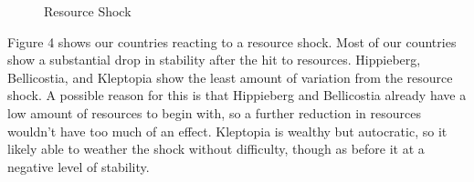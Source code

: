\documentclass[12pt]{article}
\begin{document}
\begin{spacing}{1.5}
\begin{figure}[htb]
\centering 
\caption{Resource Shock}
\end{figure}

Figure 4 shows our countries reacting to a resource shock. Most of our countries show a substantial drop in stability after the hit to resources. Hippieberg, Bellicostia, and Kleptopia show the least amount of variation from the resource shock. A possible reason for this is that Hippieberg and Bellicostia already have a low amount of resources to begin with, so a further reduction in resources wouldn't have too much of an effect. Kleptopia is wealthy but autocratic, so it likely able to weather the shock without difficulty, though as before it at a negative level of stability.  


\end{spacing}
\end{document}
